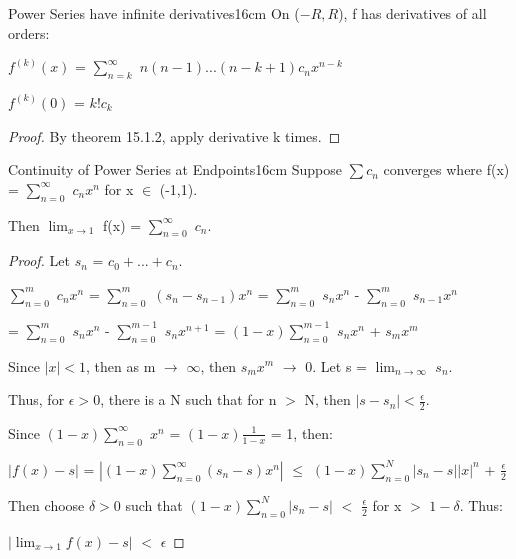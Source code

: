     \vspace{0.5cm}



    \begin{corollary}{Power Series have infinite derivatives}{16cm}
        On ($-R,R$), f has derivatives of all orders:

        \hspace{0.5cm}
        $f^{(k)}(x)$ = $\sum_{n=k}^{\infty}$ $n(n-1)...(n-k+1)c_nx^{n-k}$

        \hspace{0.5cm}
        $f^{(k)}(0)$ = $k!c_k$
    \end{corollary}

    \begin{proof}
        By {\color{red} theorem 15.1.2}, apply derivative k times.
    \end{proof}

    \vspace{0.5cm}



    \begin{wtheorem}{Continuity of Power Series at Endpoints}{16cm}
        Suppose $\sum c_n$ converges where f(x) = $\sum_{n=0}^{\infty}$ $c_n x^n$
        for x $\in$ (-1,1).
        
        Then $\lim_{x \rightarrow 1}$ f(x) = $\sum_{n=0}^{\infty}$ $c_n$.
    \end{wtheorem}

    \begin{proof}
        Let $s_n$ = $c_0 + ... + c_n$.

        \hspace{0.5cm}
        $\sum_{n=0}^m$ $c_nx^n$
        = $\sum_{n=0}^m$ $(s_n - s_{n-1})x^n$
        = $\sum_{n=0}^m$ $s_nx^n$ - $\sum_{n=0}^m$ $s_{n-1}x^n$

        \hspace{2.6cm}
        = $\sum_{n=0}^m$ $s_nx^n$ - $\sum_{n=0}^{m-1}$ $s_nx^{n+1}$
        = $(1-x)\sum_{n=0}^{m-1}$ $s_nx^n$ + $s_mx^m$

        Since $|x| < 1$, then as m $\rightarrow$ $\infty$, then $s_mx^m$
        $\rightarrow$ 0. Let s = $\lim_{n \rightarrow \infty}$ $s_n$.

        Thus, for $\epsilon > 0$, there is a N such that for n $>$ N, then
        $|s - s_n| < \frac{\epsilon}{2}$.

        Since $(1-x) \sum_{n=0}^{\infty}$ $x^n$ = $(1-x)\frac{1}{1-x}$ = 1, then:

        \hspace{0.5cm}
        $|f(x) - s|$
        = $|(1-x) \sum_{n=0}^{\infty} (s_n-s)x^n|$
        $\leq$ $(1-x) \sum_{n=0}^N |s_n - s| |x|^n$ + $\frac{\epsilon}{2}$

        Then choose $\delta > 0$ such that
        $(1-x) \sum_{n=0}^N |s_n - s|$ $<$ $\frac{\epsilon}{2}$
        for x $>$ $1-\delta$. Thus:

        \hspace{0.5cm}
        $|\lim_{x \rightarrow 1} f(x) - s|$ $<$ $\epsilon$
    \end{proof}

